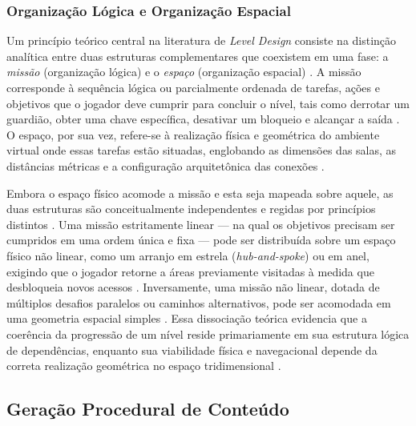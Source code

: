 \subsubsection{Organização Lógica e Organização Espacial}
\label{sec:organizacao_logica_espacial}

Um princípio teórico central na literatura de \textit{Level Design} consiste na distinção analítica entre duas estruturas complementares que coexistem em uma fase: a \textit{missão} (organização lógica) e o \textit{espaço} (organização espacial) \cite{dormans2010, linden2014dungeons}. A missão corresponde à sequência lógica ou parcialmente ordenada de tarefas, ações e objetivos que o jogador deve cumprir para concluir o nível, tais como derrotar um guardião, obter uma chave específica, desativar um bloqueio e alcançar a saída \cite{dormans2010, linden2013designing}. O espaço, por sua vez, refere-se à realização física e geométrica do ambiente virtual onde essas tarefas estão situadas, englobando as dimensões das salas, as distâncias métricas e a configuração arquitetônica das conexões \cite{dormans2010, linden2014dungeons}.

Embora o espaço físico acomode a missão e esta seja mapeada sobre aquele, as duas estruturas são conceitualmente independentes e regidas por princípios distintos \cite{dormans2010}. Uma missão estritamente linear --- na qual os objetivos precisam ser cumpridos em uma ordem única e fixa --- pode ser distribuída sobre um espaço físico não linear, como um arranjo em estrela (\textit{hub-and-spoke}) ou em anel, exigindo que o jogador retorne a áreas previamente visitadas à medida que desbloqueia novos acessos \cite{dormans2010}. Inversamente, uma missão não linear, dotada de múltiplos desafios paralelos ou caminhos alternativos, pode ser acomodada em uma geometria espacial simples \cite{dormans2010, linden2013designing}. Essa dissociação teórica evidencia que a coerência da progressão de um nível reside primariamente em sua estrutura lógica de dependências, enquanto sua viabilidade física e navegacional depende da correta realização geométrica no espaço tridimensional \cite{dormans2010, linden2013designing, linden2014dungeons}.

\subsection{Geração Procedural de Conteúdo}
\label{sec:pcg}

